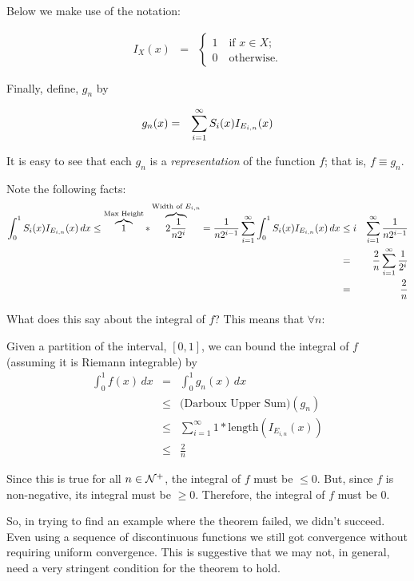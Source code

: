 \documentclass{article}
\begin{document}
Below we make use of the notation: 

\begin{eqnarray}
I_X(x) & = & \begin{cases} 1 \quad \text{if $x \in X$}; \\ 0 \quad \text{otherwise.} \end{cases}
\end{eqnarray}

Finally, define, $g_n$ by

\begin{eqnarray}
	g_{n}(x) & = & \sum_{i=1}^\infty\limits S_{i}(x) I_{E_{i,n}}(x)
\end{eqnarray}

It is easy to see that each $g_n$ is a {\em representation} of the function $f$; 
that is, $f \equiv g_n$.

Note the following facts:
\begin{eqnarray*}
  \int_0^1 S_{i}(x) I_{E_{i,n}}(x)\, dx \le \overbrace{1}^{\text{Max Height}} * \overbrace{2\frac{1}{n2^{i}}}^{\text{Width of $E_{i,n}$}} = \frac{1}{n2^{i-1}}
  \sum_{i=1}^\infty \int_0^1 S_{i}(x) I_{E_{i,n}}(x)\, dx & \le i & \sum_{i=1}^\infty\limits \frac{1}{n2^{i-1}}  \\ 
															 & =  & \frac{2}{n} \sum_{i=1}^\infty\limits \frac{1}{2^{i}} \\
															 & =  & \frac{2}{n}
 \end{eqnarray*}

What does this say about the integral of $f$? 
This means that $\forall n$: 

Given a partition of the interval, $[0,1]$, we can bound the integral of $f$ 
(assuming it is Riemann integrable) by
\begin{eqnarray*}
	\int_0^1 f(x) \, dx & =   & \int_0^1 g_{n}(x) \, dx \\
						& \le & \text{(Darboux Upper Sum)}(g_n)  \\
						& \le & \sum_{i=1}^\infty 1 * \text{length}(I_{E_{i,n}}(x)) \\
						& \le & \frac{2}{n}
\end{eqnarray*}

Since this is true for all $n \in {\cal N}^+$, the integral of $f$ must be $\le 0$. 
But, since $f$ is non-negative, its integral must be $\ge 0$. Therefore, the 
integral of $f$ must be $0$.

So, in trying to find an example where the theorem failed, we didn't succeed. 
Even using a sequence of discontinuous functions we still got convergence without 
requiring uniform convergence. This is suggestive that we may not, in general, 
need a very stringent condition for the theorem to hold.
\end{document}
